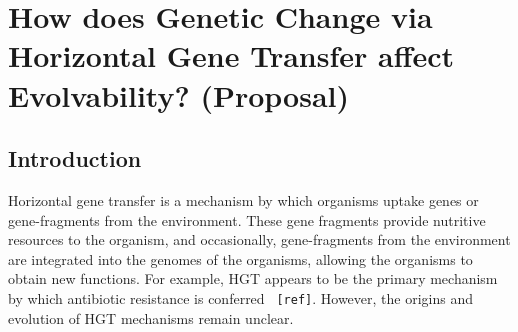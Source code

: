 \section{How does Genetic Change via Horizontal Gene Transfer affect Evolvability? (Proposal)}
\subsection{Introduction}

Horizontal gene transfer is a mechanism by which organisms uptake genes or gene-fragments from the environment.  These gene fragments provide nutritive resources to the organism, and occasionally, gene-fragments from the environment are integrated into the genomes of the organisms, allowing the organisms to obtain new functions. For example, HGT appears to be the primary mechanism by which antibiotic resistance is conferred \verb| [ref]|. However, the origins and evolution of HGT mechanisms remain unclear. 